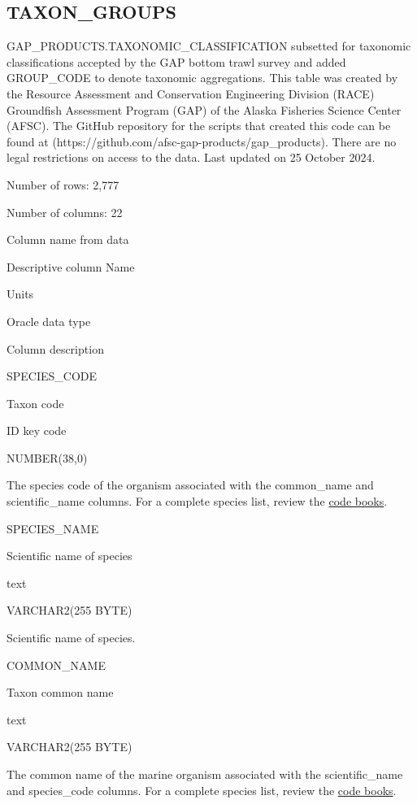 \documentclass[
  letterpaper,
  oneside,
  open=any]{scrbook}
\begin{document}
\subsection{TAXON\_GROUPS}\label{taxon_groups}

GAP\_PRODUCTS.TAXONOMIC\_CLASSIFICATION subsetted for taxonomic
classifications accepted by the GAP bottom trawl survey and added
GROUP\_CODE to denote taxonomic aggregations. This table was created by
the Resource Assessment and Conservation Engineering Division (RACE)
Groundfish Assessment Program (GAP) of the Alaska Fisheries Science
Center (AFSC). The GitHub repository for the scripts that created this
code can be found at
(https://github.com/afsc-gap-products/gap\_products). There are no legal
restrictions on access to the data. Last updated on 25 October 2024.

Number of rows: 2,777

Number of columns: 22

Column name from data

Descriptive column Name

Units

Oracle data type

Column description

SPECIES\_CODE

Taxon code

ID key code

NUMBER(38,0)

The species code of the organism associated with the common\_name and
scientific\_name columns. For a complete species list, review the
\href{https://www.fisheries.noaa.gov/resource/document/groundfish-survey-species-code-manual-and-data-codes-manual}{code
books}.

SPECIES\_NAME

Scientific name of species

text

VARCHAR2(255 BYTE)

Scientific name of species.

COMMON\_NAME

Taxon common name

text

VARCHAR2(255 BYTE)

The common name of the marine organism associated with the
scientific\_name and species\_code columns. For a complete species list,
review the
\href{https://www.fisheries.noaa.gov/resource/document/groundfish-survey-species-code-manual-and-data-codes-manual}{code
books}.
\end{document}
